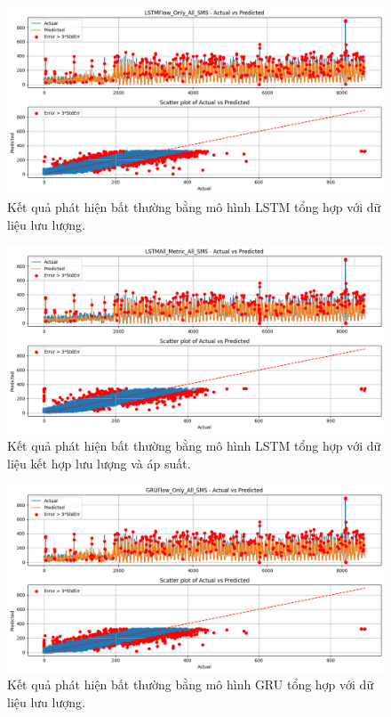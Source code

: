 \begin{figure}[H]
    \centering
    \includegraphics[width=\textwidth]{image/section6_3/anomaly_detection_combined_lstm_flow.png}
    \caption{Kết quả phát hiện bất thường bằng mô hình LSTM tổng hợp với dữ liệu lưu lượng.}
    \label{fig:anomaly_combined_lstm_flow}
\end{figure}

\begin{figure}[H]
    \centering
    \includegraphics[width=\textwidth]{image/section6_3/anomaly_detection_combined_lstm_allmetric.png}
    \caption{Kết quả phát hiện bất thường bằng mô hình LSTM tổng hợp với dữ liệu kết hợp lưu lượng và áp suất.}
    \label{fig:anomaly_combined_lstm_all}
\end{figure}

\begin{figure}[H]
    \centering
    \includegraphics[width=\textwidth]{image/section6_3/anomaly_detection_combined_gru_flow.png}
    \caption{Kết quả phát hiện bất thường bằng mô hình GRU tổng hợp với dữ liệu lưu lượng.}
    \label{fig:anomaly_combined_gru_flow}
\end{figure}

